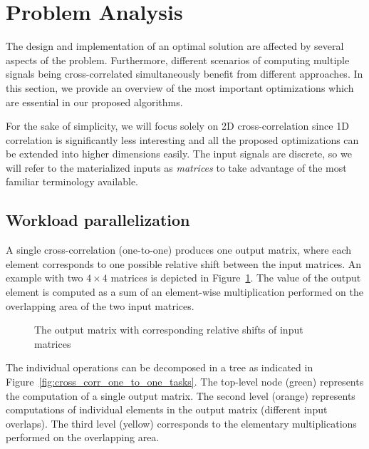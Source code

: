 \section{Problem Analysis}\label{sec:analysis}

The design and implementation of an optimal solution are affected by several aspects of the problem. Furthermore, different scenarios of computing multiple signals being cross-correlated simultaneously benefit from different approaches. In this section, we provide an overview of the most important optimizations which are essential in our proposed algorithms.

For the sake of simplicity, we will focus solely on 2D cross-correlation since 1D correlation is significantly less interesting and all the proposed optimizations can be extended into higher dimensions easily. The input signals are discrete, so we will refer to the materialized inputs as \emph{matrices} to take advantage of the most familiar terminology available.


\subsection{Workload parallelization}\label{sec:analysis-workload}

A single cross-correlation (one-to-one) produces one output matrix, where each element corresponds to one possible relative shift between the input matrices. An example with two $4\times 4$ matrices is depicted in Figure~\ref{fig:cross_corr_shifts}. The value of the output element is computed as a sum of an element-wise multiplication performed on the overlapping area of the two input matrices.

\begin{figure}[ht]
	\fontsize{6}{8}\selectfont
	\centering
	\def\svgwidth{0.6\textwidth}
	
	\caption{The output matrix with corresponding relative shifts of input matrices}
	\label{fig:cross_corr_shifts}
\end{figure}

The individual operations can be decomposed in a tree as indicated in Figure~\ref{fig:cross_corr_one_to_one_tasks}. The top-level node (green) represents the computation of a single output matrix. The second level (orange) represents computations of individual elements in the output matrix (different input overlaps). The third level (yellow) corresponds to the elementary multiplications performed on the overlapping area.

